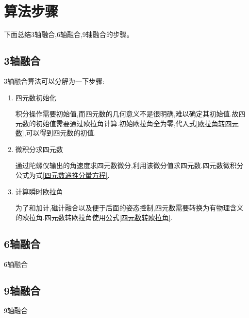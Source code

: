 
\section{算法步骤}\label{section:最终结论}
下面总结3轴融合,6轴融合,9轴融合的步骤。
\subsection{3轴融合}
3轴融合算法可以分解为一下步骤:
\begin{enumerate}
    \item 四元数初始化

        积分操作需要初始值,而四元数的几何意义不是很明确,难以确定其初始值.故四元数的初始值需要通过欧拉角计算.初始欧拉角全为零,代入式\ref{欧拉角转四元数},可以得到四元数的初值.
    \item 微积分求四元数

        通过陀螺仪输出的角速度求四元数微分,利用该微分值求四元数.四元数微积分公式为式\ref{四元数递推分量方程}.
    \item 计算瞬时欧拉角

        为了和加计,磁计融合以及便于后面的姿态控制,四元数需要转换为有物理含义的欧拉角.四元数转欧拉角使用公式\ref{四元数转欧拉角}.
\end{enumerate}

\subsection{6轴融合}
6轴融合

\subsection{9轴融合}
9轴融合


